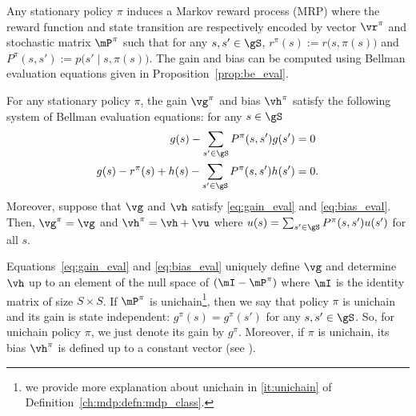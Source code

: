 Any stationary policy $\pi$ induces a Markov reward process (MRP) where the reward function and state transition are respectively encoded by vector $\vr^\pi$ and stochastic matrix $\mP^\pi$ such that for any $s,s'\in\gS$, $r^\pi(s):=r\big(s,\pi(s)\big)$ and $P^\pi(s,s'):=p\big(s'\mid s,\pi(s)\big)$.
The gain and bias can be computed using Bellman evaluation equations given in Proposition~\ref{prop:be_eval}.
\begin{prop}
    \label{prop:be_eval}
    For any stationary policy $\pi$, the gain $\vg^\pi$ and bias $\vh^\pi$ satisfy the following system of Bellman evaluation equations: for any $s\in\gS$
    \begin{align}
        g(s) -\sum_{s'\in\gS}P^\pi(s,s')g(s') &=0 \label{eq:gain_eval}\\
        g(s) -r^\pi(s) +h(s) -\sum_{s'\in\gS}P^\pi(s,s')h(s') &=0. \label{eq:bias_eval}
    \end{align}
    Moreover, suppose that $\vg$ and $\vh$ satisfy \eqref{eq:gain_eval} and \eqref{eq:bias_eval}. Then, $\vg^\pi=\vg$ and $\vh^\pi=\vh+\vu$ where $u(s)=\sum_{s'\in\gS}P^\pi(s,s')u(s')$ for all $s$.
\end{prop}
Equations~\eqref{eq:gain_eval} and \eqref{eq:bias_eval} uniquely define $\vg$ and determine $\vh$ up to an element of the null space of $(\mI-\mP^\pi)$ where $\mI$ is the identity matrix of size $S\times S$.
If $\mP^\pi$ is unichain\footnote{we provide more explanation about unichain in \ref{it:unichain} of Definition~\ref{ch:mdp:defn:mdp_class}.}, then we say that policy $\pi$ is unichain and its gain is state independent: $g^\pi(s)=g^\pi(s')$ for any $s,s'\in\gS$.
So, for unichain policy $\pi$, we just denote its gain by $g^\pi$.
Moreover, if $\pi$ is unichain, its bias $\vh^\pi$ is defined up to a constant vector (see \cite[Chapter 8]{puterman2014markov}).

